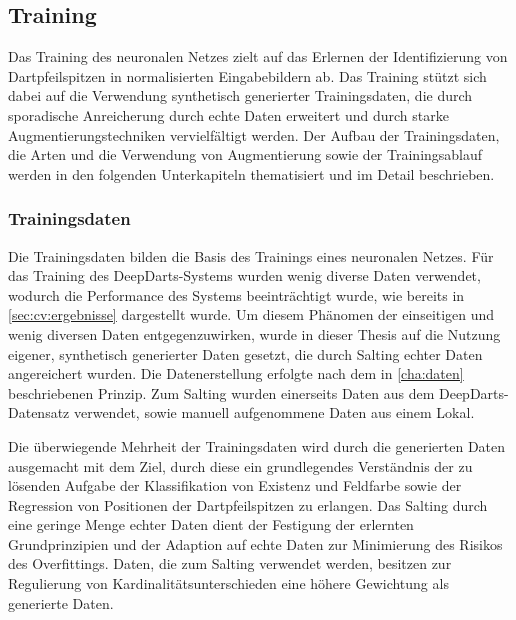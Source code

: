 
\subsection{Training}
\label{sec:nn_training}

Das Training des neuronalen Netzes zielt auf das Erlernen der Identifizierung von Dartpfeilspitzen in normalisierten Eingabebildern ab. Das Training stützt sich dabei auf die Verwendung synthetisch generierter Trainingsdaten, die durch sporadische Anreicherung durch echte Daten erweitert und durch starke Augmentierungstechniken vervielfältigt werden. Der Aufbau der Trainingsdaten, die Arten und die Verwendung von Augmentierung sowie der Trainingsablauf werden in den folgenden Unterkapiteln thematisiert und im Detail beschrieben.

\subsubsection{Trainingsdaten}
\label{sec:trainingsdaten}

Die Trainingsdaten bilden die Basis des Trainings eines neuronalen Netzes. Für das Training des DeepDarts-Systems wurden wenig diverse Daten verwendet, wodurch die Performance des Systems beeinträchtigt wurde, wie bereits in \autoref{sec:cv:ergebnisse} dargestellt wurde. Um diesem Phänomen der einseitigen und wenig diversen Daten entgegenzuwirken, wurde in dieser Thesis auf die Nutzung eigener, synthetisch generierter Daten gesetzt, die durch Salting echter Daten angereichert wurden. Die Datenerstellung erfolgte nach dem in \autoref{cha:daten} beschriebenen Prinzip. Zum Salting wurden einerseits Daten aus dem DeepDarts-Datensatz verwendet, sowie manuell aufgenommene Daten aus einem Lokal.

Die überwiegende Mehrheit der Trainingsdaten wird durch die generierten Daten ausgemacht mit dem Ziel, durch diese ein grundlegendes Verständnis der zu lösenden Aufgabe der Klassifikation von Existenz und Feldfarbe sowie der Regression von Positionen der Dartpfeilspitzen zu erlangen. Das Salting durch eine geringe Menge echter Daten dient der Festigung der erlernten Grundprinzipien und der Adaption auf echte Daten zur Minimierung des Risikos des Overfittings. Daten, die zum Salting verwendet werden, besitzen zur Regulierung von Kardinalitätsunterschieden eine höhere Gewichtung als generierte Daten.

